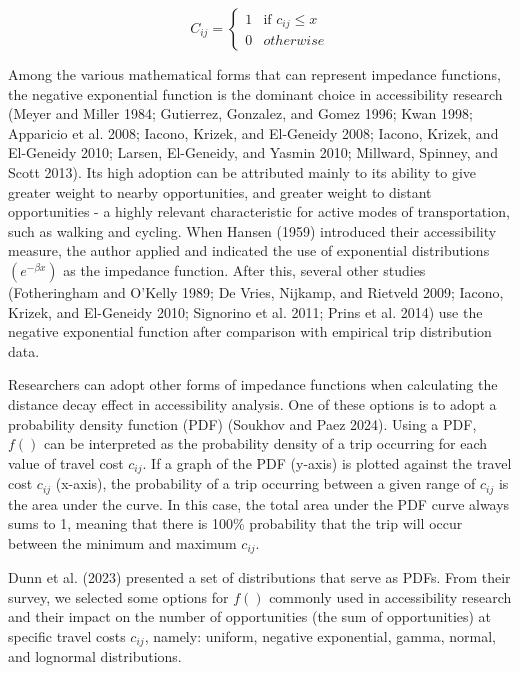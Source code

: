 \documentclass[preprint, 3p,
authoryear]{elsarticle} %
\begin{document}
\begin{equation}
C_{ij} =
\begin{cases}
  1 & \text{if } c_{ij} \le x \\
  0 & otherwise
\end{cases}
\label{eq:cumulative-equation}
\end{equation}

Among the various mathematical forms that can represent impedance
functions, the negative exponential function is the dominant choice in
accessibility research (Meyer and Miller 1984; Gutierrez, Gonzalez, and
Gomez 1996; Kwan 1998; Apparicio et al. 2008; Iacono, Krizek, and
El-Geneidy 2008; Iacono, Krizek, and El-Geneidy 2010; Larsen,
El-Geneidy, and Yasmin 2010; Millward, Spinney, and Scott 2013). Its
high adoption can be attributed mainly to its ability to give greater
weight to nearby opportunities, and greater weight to distant
opportunities - a highly relevant characteristic for active modes of
transportation, such as walking and cycling. When Hansen (1959)
introduced their accessibility measure, the author applied and indicated
the use of exponential distributions \((e ^ {-\beta x})\) as the
impedance function. After this, several other studies (Fotheringham and
O'Kelly 1989; De Vries, Nijkamp, and Rietveld 2009; Iacono, Krizek, and
El-Geneidy 2010; Signorino et al. 2011; Prins et al. 2014) use the
negative exponential function after comparison with empirical trip
distribution data.

Researchers can adopt other forms of impedance functions when
calculating the distance decay effect in accessibility analysis. One of
these options is to adopt a probability density function (PDF) (Soukhov
and Paez 2024). Using a PDF, \(f()\) can be interpreted as the
probability density of a trip occurring for each value of travel cost
\(c_{ij}\). If a graph of the PDF (y-axis) is plotted against the travel
cost \(c_{ij}\) (x-axis), the probability of a trip occurring between a
given range of \(c_{ij}\) is the area under the curve. In this case, the
total area under the PDF curve always sums to 1, meaning that there is
100\% probability that the trip will occur between the minimum and
maximum \(c_{ij}\).

Dunn et al. (2023) presented a set of distributions that serve as PDFs.
From their survey, we selected some options for \(f()\) commonly used in
accessibility research and their impact on the number of opportunities
(the sum of opportunities) at specific travel costs \(c_{ij}\), namely:
uniform, negative exponential, gamma, normal, and lognormal
distributions.
\end{document}
